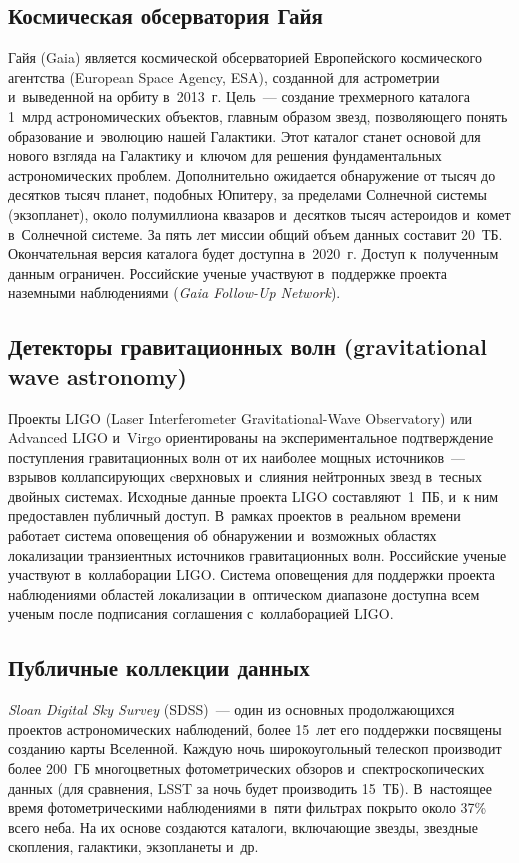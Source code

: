 \begin{multicols}{2}
\subsection{Космическая обсерватория Гайя}

  Гайя  (Gaia) является космической обсерваторией Европейского космического агентства 
  (European Space Agency, ESA), 
созданной для астрометрии и~выведенной на орбиту в~2013~г. Цель~--- создание 
трехмерного каталога 1~млрд астрономических объектов, главным образом 
звезд, позволяющего понять образование и~эволюцию нашей Галактики. Этот каталог 
станет основой для нового взгляда на Галактику и~ключом для решения фундаментальных 
астрономических проблем. Дополнительно ожидается обнаружение от тысяч до десятков 
тысяч планет, подобных Юпитеру, за пределами Солнечной сис\-те\-мы (экзопланет), около 
полумиллиона квазаров и~десятков тысяч астероидов и~комет в~Солнечной сис\-те\-ме. За пять 
лет миссии общий объем данных составит 20~ТБ. Окончательная версия каталога будет 
доступна в~2020~г. Доступ к~полученным данным ограничен. Российские ученые 
участвуют в~поддержке проекта наземными наблюдениями (\textit{Gaia Follow-Up 
Network}). 

\subsection{Детекторы гравитационных волн (gravitational wave astronomy)}

  Проекты LIGO (Laser Interferometer Gravitational-Wave Observatory) или
  Advanced LIGO и~Virgo ориентированы на экспериментальное 
подтверждение поступления гравитационных волн от их наиболее мощных источников~--- 
взрывов кол\-лапси\-ру\-ющих cверхновых и~слияния нейтронных звезд в~тесных двойных 
системах. Исходные данные проекта LIGO составляют~1~ПБ, и~к ним предо\-став\-лен 
пуб\-лич\-ный доступ. В~рамках проектов в~реальном времени работает система оповещения 
об обнаружении и~возможных областях локализации транзиентных источников 
гравитационных волн. Российские ученые участвуют в~коллаборации LIGO. Система 
оповещения для поддержки проекта наблюдениями областей локализации в~оптическом 
диапазоне доступна всем ученым после подписания соглашения с~коллаборацией LIGO.

\subsection{Публичные коллекции данных}
  
  \textit{Sloan Digital Sky Survey} (SDSS)~--- один из основных продолжающихся проектов 
астрономических наблюдений, более 15~лет его поддержки посвящены созданию карты 
Вселенной. Каждую ночь широкоугольный телескоп производит более 200~ГБ 
многоцветных фотометрических обзоров и~спект\-ро\-скопических данных (для сравнения, 
LSST за ночь будет производить 15~ТБ). В~настоящее время фотометрическими 
наблюдениями в~пяти фильтрах покрыто около 37\% всего неба. На их основе создаются 
каталоги, включающие звезды, звездные скопления, галактики, экзопланеты и~др.
  

\end{multicols}
